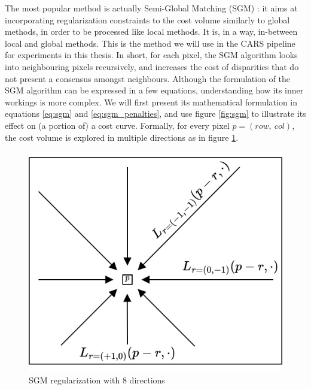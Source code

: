 The most popular method is actually Semi-Global Matching (SGM) \cite{hirschmuller_accurate_2005}: it aims at incorporating regularization constraints to the cost volume similarly to global methods, in order to be processed like local methods. It is, in a way, in-between local and global methods. This is the method we will use in the CARS pipeline for experiments in this thesis. In short, for each pixel, the SGM algorithm looks into neighbouring pixels recursively, and increases the cost of disparities that do not present a consensus amongst neighbours. Although the formulation of the SGM algorithm can be expressed in a few equations, understanding how its inner workings is more complex. We will first present its mathematical formulation in equations \eqref{eq:sgm} and \eqref{eq:sgm_penalties}, and use figure \ref{fig:sgm} to illustrate its effect on (a portion of) a cost curve. Formally, for every pixel $p=(row, ~col)$, the cost volume is explored in multiple directions as in figure \ref{fig:sgm_directions}.

\begin{figure}
	\centering
	\includegraphics[width=0.5\linewidth]{Images/Chap_1/SGM_directions.png}
	\caption{SGM regularization with $8$ directions}
	\label{fig:sgm_directions}
\end{figure}

